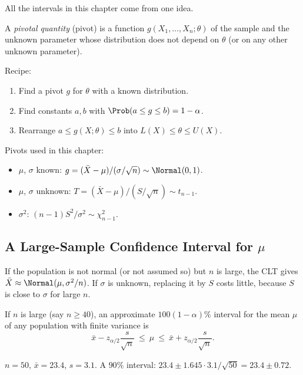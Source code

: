 All the intervals in this chapter come from one idea.

\begin{definition}
A \emph{pivotal quantity} (pivot) is a function $g(X_1,\dots,X_n;\theta)$ of the sample and the unknown parameter whose distribution does not depend on $\theta$ (or on any other unknown parameter).
\end{definition}

Recipe:
\begin{enumerate}
  \item Find a pivot $g$ for $\theta$ with a known distribution.
  \item Find constants $a,b$ with $\Prob(a\le g\le b)=1-\alpha$.
  \item Rearrange $a\le g(X;\theta)\le b$ into $L(X)\le\theta\le U(X)$.
\end{enumerate}

\begin{example}
Pivots used in this chapter:
\begin{itemize}
  \item $\mu$, $\sigma$ known: $g=(\bar{X}-\mu)/(\sigma/\sqrt n)\sim\Normal(0,1)$.
  \item $\mu$, $\sigma$ unknown: $T=(\bar{X}-\mu)/(S/\sqrt n)\sim t_{n-1}$.
  \item $\sigma^2$: $(n-1)S^2/\sigma^2\sim\chi^2_{n-1}$.
\end{itemize}
\end{example}

\subsection{A Large-Sample Confidence Interval for $\mu$}

If the population is not normal (or not assumed so) but $n$ is large, the CLT gives $\bar{X}\approx\Normal(\mu,\sigma^2/n)$. If $\sigma$ is unknown, replacing it by $S$ costs little, because $S$ is close to $\sigma$ for large $n$.

\begin{theorem}\label{thm:largesample}
If $n$ is large (say $n\ge40$), an approximate $100(1-\alpha)\%$ interval for the mean $\mu$ of any population with finite variance is
\[ \bar{x}-z_{\alpha/2}\frac{s}{\sqrt n}\ \le\ \mu\ \le\ \bar{x}+z_{\alpha/2}\frac s{\sqrt n}. \]
\end{theorem}

\begin{example}
$n=50$, $\bar{x}=23.4$, $s=3.1$. A $90\%$ interval: $23.4\pm1.645\cdot3.1/\sqrt{50}=23.4\pm0.72$.
\end{example}

